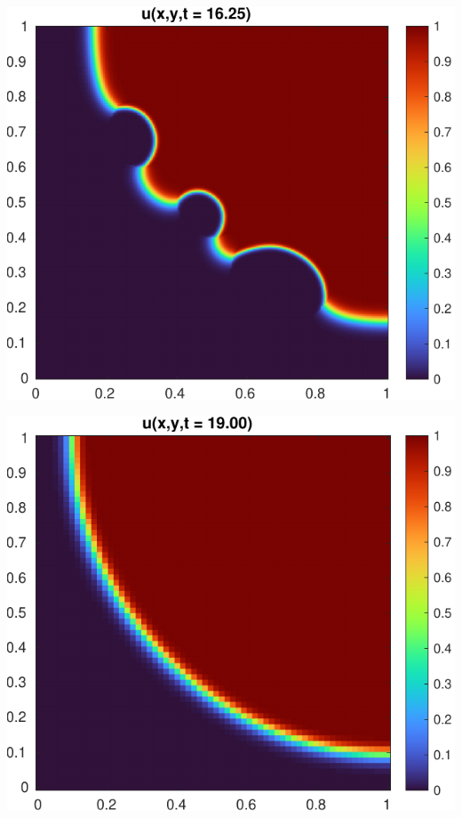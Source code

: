 \documentclass[14pt,aspectratio=169]{beamer}
\begin{document}
\begin{frame}
\end{frame}

\begin{frame}
	\centering
	\includegraphics[height=\textheight]{figs/S01.pdf}
\end{frame}

\begin{frame}
	\centering
	\includegraphics[height=\textheight]{figs/S1.pdf}
\end{frame}
\end{document}
